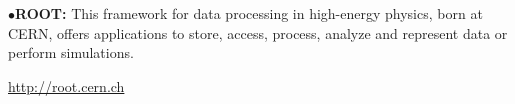 


\item{$\bullet$}{\bf ROOT:}
This framework for data processing in high-energy physics, born at CERN, offers applications to store, access, process, analyze and represent data or perform simulations.
	\item{}\qquad\url{http://root.cern.ch}

\medskip










